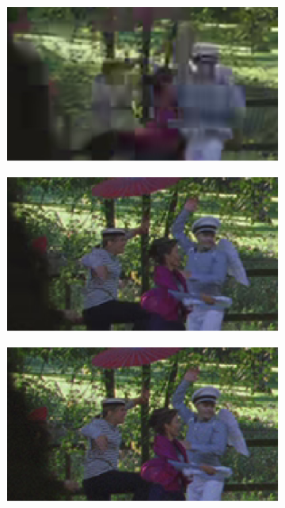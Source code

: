 \begin{figure}[!htpb]
    \centering 
        \begin{subfigure}[c]{\textwidth}
            \centering
            \includegraphics[height=0.25\textheight]{Sections/3Transforms/Images/lowParkDetail.png}
            \caption{}
            \label{subfig:lowq}
        \end{subfigure}
        \begin{subfigure}[c]{\textwidth}
            \centering
            \includegraphics[height=0.25\textheight]{Sections/3Transforms/Images/medParkDetail.png}
            \caption{}
            \label{subfig:medq}
        \end{subfigure}
        \begin{subfigure}[c]{\textwidth}
            \centering
            \includegraphics[height=0.25\textheight]{Sections/3Transforms/Images/highParkDetail.png}

\end{subfigure}
\end{figure}
